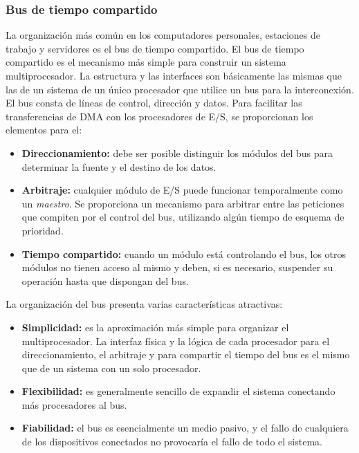 \subsubsection*{Bus de tiempo compartido}

La organización más común en los computadores personales, estaciones de trabajo y servidores es el bus de tiempo compartido. El bus de tiempo compartido es el mecanismo más simple para construir un sistema multiprocesador. La estructura y las interfaces son básicamente las mismas que las de un sistema de un único procesador que utilice un bus para la interconexión. El bus consta de líneas de control, dirección y datos. Para facilitar las transferencias de DMA con los procesadores de E/S, se proporcionan los elementos para el:

\begin{itemize}
  \item \textbf{Direccionamiento:} debe ser posible distinguir los módulos del bus para determinar la fuente y el destino de los datos.
  \item \textbf{Arbitraje:} cualquier módulo de E/S puede funcionar temporalmente como un \textit{maestro}. Se proporciona un mecanismo para arbitrar entre las peticiones que compiten por el control del bus, utilizando algún tiempo de esquema de prioridad.
  \item \textbf{Tiempo compartido:} cuando un módulo está controlando el bus, los otros módulos no tienen acceso al mismo y deben, si es necesario, suspender su operación hasta que dispongan del bus.
\end{itemize}

La organización del bus presenta varias características atractivas:

\begin{itemize}
  \item \textbf{Simplicidad:} es la aproximación más simple para organizar el multiprocesador. La interfaz física y la lógica de cada procesador para el direccionamiento, el arbitraje y para compartir el tiempo del bus es el mismo que de un sistema con un solo procesador.
  \item \textbf{Flexibilidad:} es generalmente sencillo de expandir el sistema conectando más procesadores al bus.
  \item \textbf{Fiabilidad:} el bus es esencialmente un medio pasivo, y el fallo de cualquiera de los dispositivos conectados no provocaría el fallo de todo el sistema.
\end{itemize}

